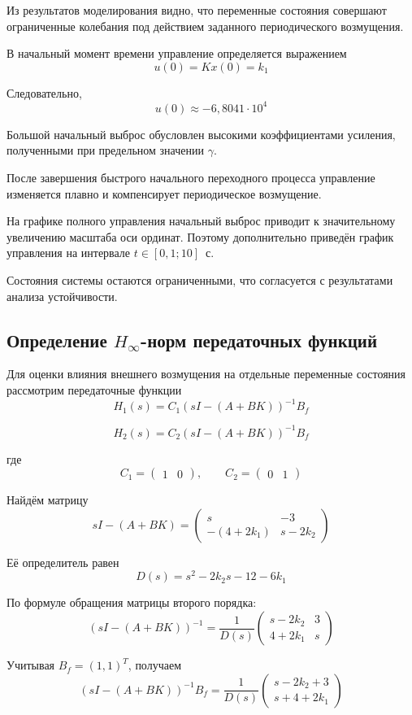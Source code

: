 Из результатов моделирования видно, что переменные
состояния совершают ограниченные колебания под действием
заданного периодического возмущения.

В начальный момент времени управление определяется
выражением
\[
u(0)=Kx(0)=k_1
\]

Следовательно,
\[
u(0)\approx-6{,}8041\cdot10^4
\]

Большой начальный выброс обусловлен высокими
коэффициентами усиления, полученными при предельном
значении $\gamma$.

После завершения быстрого начального переходного
процесса управление изменяется плавно и компенсирует
периодическое возмущение.

На графике полного управления начальный выброс
приводит к значительному увеличению масштаба оси ординат.
Поэтому дополнительно приведён график управления
на интервале $t\in[0{,}1;10]$~с.

Состояния системы остаются ограниченными, что согласуется
с результатами анализа устойчивости.

\subsection{Определение $H_\infty$-норм передаточных функций}

Для оценки влияния внешнего возмущения на отдельные
переменные состояния рассмотрим передаточные функции
\[
H_1(s)=C_1(sI-(A+BK))^{-1}B_f
\]

\[
H_2(s)=C_2(sI-(A+BK))^{-1}B_f
\]

где
\[
C_1=\begin{pmatrix}1&0\end{pmatrix},
\qquad
C_2=\begin{pmatrix}0&1\end{pmatrix}
\]

Найдём матрицу
\[
sI-(A+BK)=
\begin{pmatrix}
s&-3\\
-(4+2k_1)&s-2k_2
\end{pmatrix}
\]

Её определитель равен
\[
D(s)=s^2-2k_2s-12-6k_1
\]

По формуле обращения матрицы второго порядка:
\[
(sI-(A+BK))^{-1}
=
\frac{1}{D(s)}
\begin{pmatrix}
s-2k_2&3\\
4+2k_1&s
\end{pmatrix}
\]

Учитывая $B_f=(1,1)^T$, получаем
\[
(sI-(A+BK))^{-1}B_f
=
\frac{1}{D(s)}
\begin{pmatrix}
s-2k_2+3\\
s+4+2k_1
\end{pmatrix}
\]


